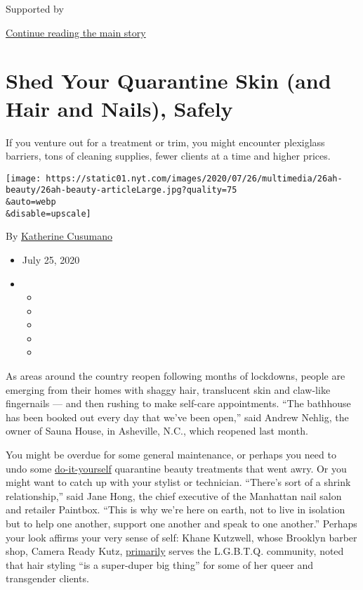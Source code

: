 Supported by

\protect\hyperlink{after-sponsor}{Continue reading the main story}

\hypertarget{shed-your-quarantine-skin-and-hair-and-nails-safely}{%
\section{Shed Your Quarantine Skin (and Hair and Nails),
Safely}\label{shed-your-quarantine-skin-and-hair-and-nails-safely}}

If you venture out for a treatment or trim, you might encounter
plexiglass barriers, tons of cleaning supplies, fewer clients at a time
and higher prices.

\texttt{[image: https://static01.nyt.com/images/2020/07/26/multimedia/26ah-beauty/26ah-beauty-articleLarge.jpg?quality=75\\\&auto=webp\\\&disable=upscale]}

By \href{https://www.nytimes.com/by/katherine-cusumano}{Katherine
Cusumano}

\begin{itemize}
\item
  July 25, 2020
\item
  \begin{itemize}
  \item
  \item
  \item
  \item
  \item
  \end{itemize}
\end{itemize}

As areas around the country reopen following months of lockdowns, people
are emerging from their homes with shaggy hair, translucent skin and
claw-like fingernails --- and then rushing to make self-care
appointments. ``The bathhouse has been booked out every day that we've
been open,'' said Andrew Nehlig, the owner of Sauna House, in Asheville,
N.C., which reopened last month.

You might be overdue for some general maintenance, or perhaps you need
to undo some
\href{https://www.nytimes.com/2020/04/02/t-magazine/home-hair-care-tips-coronavirus.html}{do-it-yourself}
quarantine beauty treatments that went awry. Or you might want to catch
up with your stylist or technician. ``There's sort of a shrink
relationship,'' said Jane Hong, the chief executive of the Manhattan
nail salon and retailer Paintbox. ``This is why we're here on earth, not
to live in isolation but to help one another, support one another and
speak to one another.'' Perhaps your look affirms your very sense of
self: Khane Kutzwell, whose Brooklyn barber shop, Camera Ready Kutz,
\href{https://www.nytimes.com/2020/03/11/nyregion/nyc-queer-black-barbershops.html}{primarily}
serves the L.G.B.T.Q. community, noted that hair styling ``is a
super-duper big thing'' for some of her queer and transgender clients.

